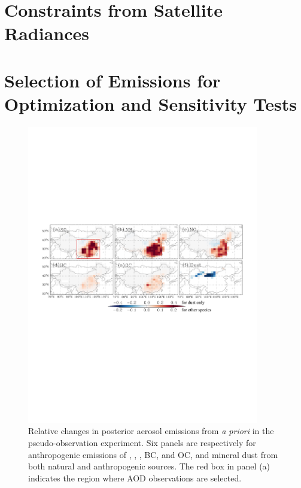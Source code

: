 \section{Constraints from Satellite Radiances}

\section{Selection of Emissions for Optimization and Sensitivity Tests}

 \begin{figure}[h]
  \centering
  \includegraphics[width={0.9\textwidth}]{figures/a2.pdf}
  \caption{Relative changes in posterior aerosol emissions from \textit{a priori} 
   in the pseudo-observation experiment. 
   Six panels are respectively for anthropogenic emissions of , , 
   , BC, and OC, and mineral dust from both natural and anthropogenic sources. 
   The red box in panel (a) indicates the region where AOD observations are selected. }
  \label{fig:pseudo1}
 \end{figure}

